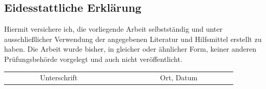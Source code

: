 \documentclass[a4paper,11pt,singlespacing]{article}
\begin{document}
\newpage




\begin{newpage}
\vspace*{\fill}
\section*{Eidesstattliche Erklärung}\label{sec:Eidesstattliche Erklärung}
	Hiermit versichere ich, die vorliegende Arbeit selbstständig und unter ausschlie{\ss}licher Verwendung der angegebenen Literatur und Hilfsmittel erstellt zu haben. Die Arbeit wurde bisher, in gleicher oder ähnlicher Form, keiner anderen Prüfungsbehörde vorgelegt und auch nicht veröffentlicht.\\

\vspace{3cm}
\begin{tabular*}{\textwidth}{c@{\extracolsep\fill}cc}
\cline{1-1}
\cline{3-3}
\\
\ \ \ \ \ \ \ \ \ Unterschrift\ \ \ \ \ \ \ \ \ \ & & \ \ \ \ \ \ \ \ \ Ort, Datum\ \ \ \ \ \ \ \ \ \\
\end{tabular*}
\end{newpage}
\end{document}
